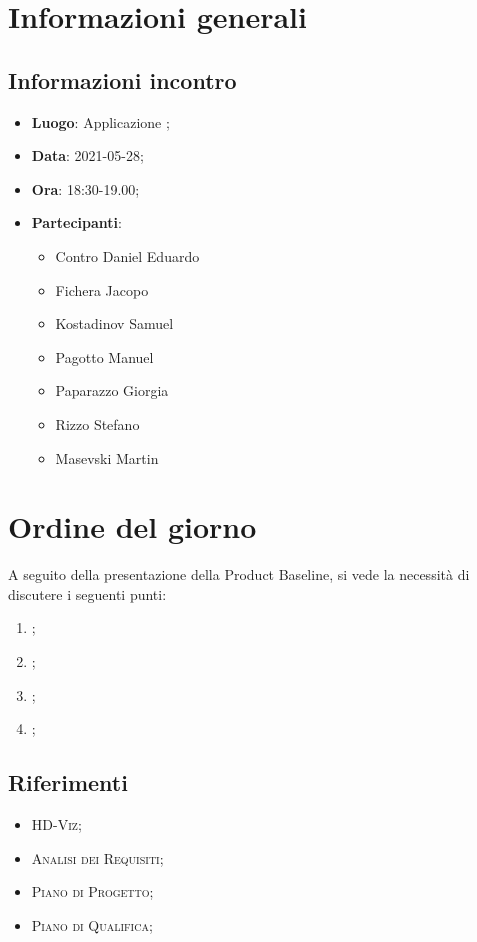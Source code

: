 \documentclass{article}
\begin{document}


\section{Informazioni generali}
\label{sec:info_generali}

\subsection{Informazioni incontro}
\label{sub:info_incontro}

\begin{itemize}
	\item \textbf{Luogo}: Applicazione ;
	\item \textbf{Data}: 2021-05-28;
	\item \textbf{Ora}: 18:30-19.00;
	\item \textbf{Partecipanti}:
	\begin{itemize}
		\item Contro Daniel Eduardo
		\item Fichera Jacopo
		\item Kostadinov Samuel
        \item Pagotto Manuel
		\item Paparazzo Giorgia
		\item Rizzo Stefano
		\item Masevski Martin
	\end{itemize}
\end{itemize}

\section{Ordine del giorno}%
\label{sec:ordine_del_giorno}
A seguito della presentazione della Product Baseline, si vede la necessità di discutere i seguenti punti:
\begin{enumerate}
	\item {};
	\item {};
	\item {};
	\item {};
\end{enumerate}


\subsection{Riferimenti}%
\label{sub:riferimenti}
\begin{itemize}
    \item \textsc{HD-Viz};
    \item \textsc{Analisi dei Requisiti};
    \item \textsc{Piano di Progetto};
    \item \textsc{Piano di Qualifica};
    \end{itemize}
\end{document}

